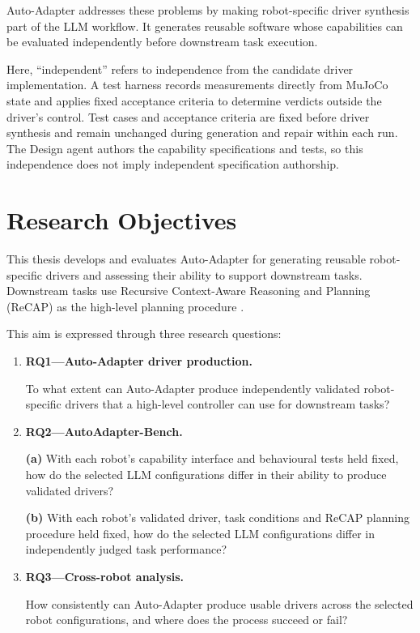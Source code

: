 Auto-Adapter addresses these problems by making robot-specific driver
synthesis part of the LLM workflow. It generates reusable software whose
capabilities can be evaluated independently before downstream task execution.

Here, ``independent'' refers to independence from the candidate driver
implementation. A test harness records measurements directly from MuJoCo state
and applies fixed acceptance criteria to determine verdicts outside the
driver's control. Test cases and acceptance criteria are fixed before driver
synthesis and remain unchanged during generation and repair within each run.
The Design agent authors the capability specifications and tests, so this
independence does not imply independent specification authorship.

\section[Research Objectives]{Research Objectives}
\label{sec:research-objectives}

This thesis develops and evaluates Auto-Adapter for generating reusable
robot-specific drivers and assessing their ability to support downstream
tasks. Downstream tasks use Recursive Context-Aware Reasoning and Planning
(ReCAP) as the high-level planning procedure \citep{zhang2025recap}.

This aim is expressed through three research questions:

\begin{enumerate}
    \item \textbf{RQ1---Auto-Adapter driver production.}

    To what extent can Auto-Adapter produce independently validated
    robot-specific drivers that a high-level controller can use for downstream
    tasks?

    \item \textbf{RQ2---AutoAdapter-Bench.}

    \textbf{(a)} With each robot's capability interface and behavioural tests
    held fixed, how do the selected LLM configurations differ in their ability
    to produce validated drivers?

    \textbf{(b)} With each robot's validated driver, task conditions and ReCAP
    planning procedure held fixed, how do the selected LLM configurations
    differ in independently judged task performance?

    \item \textbf{RQ3---Cross-robot analysis.}

    How consistently can Auto-Adapter produce usable drivers across the
    selected robot configurations, and where does the process succeed or fail?
\end{enumerate}

